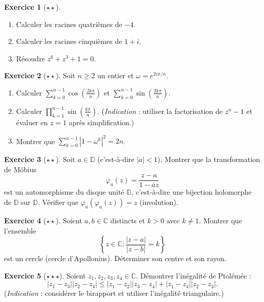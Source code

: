 \documentclass[12pt,a4paper,openany]{book}
\theoremstyle{definition}
\newtheorem{exercice}{Exercice}[chapter]
\theoremstyle{plain}
\theoremstyle{remark}
\newcommand{\C}{\mathbb{C}}
\newcommand{\D}{\mathbb{D}}
\newcommand{\abs}[1]{\left|#1\right|}
\newcommand{\conj}[1]{\overline{#1}}
\begin{document}
\begin{exercice}[$\star\star$]\label{exo:racines-explicites}
\begin{enumerate}[label=(\alph*)]
  \item Calculer les racines quatrièmes de $-4$.
  \item Calculer les racines cinquièmes de $1+i$.
  \item Résoudre $z^6 + z^3 + 1 = 0$.
\end{enumerate}
\end{exercice}

\begin{exercice}[$\star\star$]\label{exo:somme-racines}
Soit $n \geq 2$ un entier et $\omega = e^{2i\pi/n}$.
\begin{enumerate}[label=(\alph*)]
  \item Calculer $\sum_{k=0}^{n-1} \cos\!\left(\frac{2k\pi}{n}\right)$ et $\sum_{k=0}^{n-1} \sin\!\left(\frac{2k\pi}{n}\right)$.
  \item Calculer $\prod_{k=1}^{n-1} \sin\!\left(\frac{k\pi}{n}\right)$. (\emph{Indication} : utiliser la factorisation de $z^n - 1$ et évaluer en $z = 1$ après simplification.)
  \item Montrer que $\sum_{k=0}^{n-1} \abs{1 - \omega^k}^2 = 2n$.
\end{enumerate}
\end{exercice}

\begin{exercice}[$\star\star$]\label{exo:mobius-disque}
Soit $a \in \D$ (c'est-à-dire $\abs{a} < 1$). Montrer que la transformation de Möbius
\[
  \varphi_a(z) = \frac{z - a}{1 - \conj{a}z}
\]
est un automorphisme du disque unité $\D$, c'est-à-dire une bijection holomorphe de $\D$ sur $\D$. Vérifier que $\varphi_a(\varphi_a(z)) = z$ (involution).
\end{exercice}

\begin{exercice}[$\star\star$]\label{exo:apollonius}
Soient $a, b \in \C$ distincts et $k > 0$ avec $k \neq 1$. Montrer que l'ensemble
\[
  \left\{z \in \C : \frac{\abs{z - a}}{\abs{z - b}} = k\right\}
\]
est un cercle (cercle d'Apollonius). Déterminer son centre et son rayon.
\end{exercice}

\begin{exercice}[$\star\star\star$]\label{exo:ptolemee}
Soient $z_1, z_2, z_3, z_4 \in \C$. Démontrer l'inégalité de Ptolémée :
\[
  \abs{z_1 - z_3}\abs{z_2 - z_4} \leq \abs{z_1 - z_2}\abs{z_3 - z_4} + \abs{z_1 - z_4}\abs{z_2 - z_3}.
\]
(\emph{Indication} : considérer le birapport et utiliser l'inégalité triangulaire.)
\end{exercice}
\end{document}
